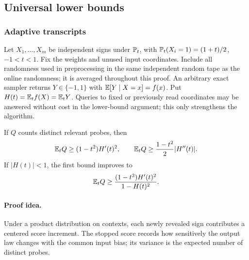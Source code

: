 \subsection{Universal lower bounds}\label{sec:lower}

\subsubsection{Adaptive transcripts}

Let \(X_1,\dots,X_m\) be independent signs under \(\mathbb P_t\), with
\(\mathbb P_t(X_i=1)=(1+t)/2\), \(-1<t<1\).
Fix the weights and unused input coordinates. Include all randomness
used in preprocessing in the same independent random tape as the
online randomness; it is averaged throughout this proof.
An arbitrary exact sampler returns \(Y\in\{-1,1\}\) with
\(\mathbb E[Y\mid X=x]=f(x)\).
Put \(H(t)=\mathbb E_tf(X)=\mathbb E_tY\).
Queries to fixed or previously read coordinates may be answered
without cost in the lower-bound argument; this only strengthens
the algorithm.

\begin{lemma}\label{lem:transcript}
If \(Q\) counts distinct relevant probes, then
\begin{equation}\label{eq:transcript}
\mathbb E_tQ\ge(1-t^2)H'(t)^2,\qquad
\mathbb E_tQ\ge\frac{1-t^2}{2}|H''(t)|.
\end{equation}
If \(|H(t)|<1\), the first bound improves to
\begin{equation}\label{eq:transcript-variance}
\mathbb E_tQ\ge\frac{(1-t^2)H'(t)^2}{1-H(t)^2}.
\end{equation}
\end{lemma}
\paragraph{Proof idea.}
Under a product distribution on contexts, each newly revealed sign
contributes a centered score increment. The stopped score records how
sensitively the output law changes with the common input bias; its variance
is the expected number of distinct probes.

